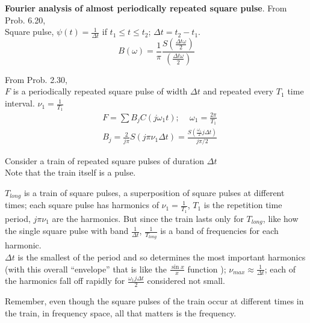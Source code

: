 \documentclass[twoside,10pt]{amsart}
\newcommand{\problemhead}[1]
  {\smallskip
   \noindent{\large\bf Problem #1.}
   \smallskip}
\begin{document}
\problemhead{6.22} \textbf{ Fourier analysis of almost periodically repeated square pulse}.  
From Prob. 6.20, \\
\phantom{ From } Square pulse, $\psi(t) = \frac{1}{ \Delta t}$ if $t_1 \leq t \leq t_2$; \quad $\Delta t = t_2 - t_1 $.  
\[
B(\omega) = \frac{1}{ \pi} \frac{ S\left( \frac{ \Delta t \omega}{2} \right) }{ \left( \frac{ \Delta t \omega}{2} \right) }
\]

From Prob. 2.30, \\
\phantom{ From } $F$ is a periodically repeated square pulse of width $\Delta t$ and repeated every $T_1$ time interval.  $\nu_1 = \frac{1}{ T_1}$ 
\[
\begin{aligned}
  & F = \sum B_j C(j \omega_1 t ); \quad \, \omega_1 = \frac{2\pi}{T_1} \\
  & B_j = \frac{2}{ j \pi } S( j \pi \nu_1 \Delta t) = \frac{ S\left( \frac{ \omega_1}{2} j \Delta t \right) }{ j \pi /2 }
\end{aligned}
\]

Consider a train of repeated square pulses of duration $\Delta t$ \\
Note that the train itself is a pulse.  

$T_{long}$ is a train of square pulses, a superposition of square pulses at different times; each square pulse has harmonics of $\nu_1 = \frac{1}{T_1}$, $T_1$ is the repetition time period, $j \pi \nu_1$ are the harmonics.  But since the train lasts only for $T_{long}$, like how the single square pulse with band $\frac{1}{\Delta t}$, $\frac{1}{ T_{long}}$ is a band of frequencies for each harmonic.  \\
$\Delta t$ is the smallest of the period and so determines the most important harmonics (with this overall ``envelope'' that is like the $\frac{\sin{x}}{x}$ function ); \quad $\nu_{max} \approx \frac{1}{ \Delta t}$; each of the harmonics fall off rapidly for $\frac{ \omega_1 j \Delta t}{ 2}$ considered not small.  

Remember, even though the square pulses of the train occur at different times in the train, in frequency space, all that matters is the frequency.  
\end{document}

